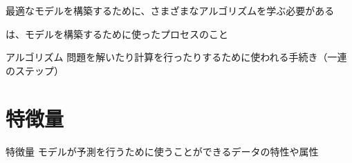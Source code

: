 \documentclass[../../../topic_machine-learning]{subfiles}
\begin{document}
\br

最適なモデルを構築するために、さまざまなアルゴリズムを学ぶ必要がある

は、モデルを構築するために使ったプロセスのこと

\begin{definition}{アルゴリズム}
  問題を解いたり計算を行ったりするために使われる手続き（一連のステップ）
\end{definition}

\sectionline
\section{特徴量}

\begin{definition}{特徴量}
  モデルが予測を行うために使うことができるデータの特性や属性
\end{definition}
\end{document}

